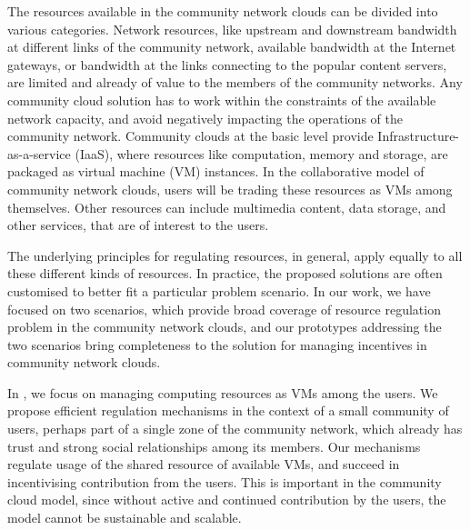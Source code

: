The resources available in the community network clouds can be divided into various categories.
Network resources, like upstream and downstream bandwidth at different links of the community network, 
available bandwidth at the Internet gateways, 
or bandwidth at the links connecting to the popular content servers, 
are limited and already of value to the members of the community networks.
Any community cloud solution has to work within the constraints of the available network capacity, 
and avoid negatively impacting the operations of the community network.
Community clouds at the basic level provide Infrastructure-as-a-service (IaaS), 
where resources like computation, memory and storage, are packaged as virtual machine (VM) instances.
In the collaborative model of community network clouds, users will be trading these resources as VMs among themselves. 
Other resources can include multimedia content, data storage, and other services, that are of interest to the users.

The underlying principles for regulating resources, in general, apply equally to all these different kinds of resources. 
In practice, the proposed solutions are often customised to better fit a particular problem scenario.
In our work, we have focused on two scenarios, which provide broad coverage of resource regulation problem in the community network clouds, 
and our prototypes addressing the two scenarios bring completeness to the solution for managing incentives in community network clouds. 

In , we focus on managing computing resources as VMs among the users.
We propose efficient regulation mechanisms in the context of a small community of users, 
perhaps part of a single zone of the community network, 
which already has trust and strong social relationships among its members.
Our mechanisms regulate usage of the shared resource of available VMs, 
and succeed in incentivising contribution from the users.
This is important in the community cloud model, since without active and continued contribution by the users,
the model cannot be sustainable and scalable.

